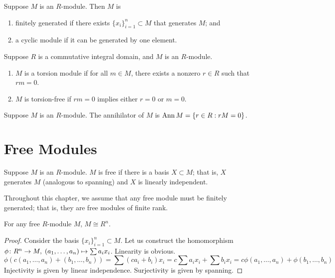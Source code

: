 \begin{definition}
    Suppose \(M\) is an \(R\)-module. Then \(M\) is 
    \begin{enumerate}[label={(\roman*)}, itemsep=0mm]
        \item finitely generated if there exists \({\{x_i\}}_{i=1}^n \subset M\) that generates \(M\); and
        \item a cyclic module if it can be generated by one element.
    \end{enumerate}
\end{definition}
\begin{definition}
    Suppose \(R\) is a commutative integral domain,
    and \(M\) is an \(R\)-module.
    \begin{enumerate}[label={(\roman*)}, itemsep=0mm]
        \item \(M\) is a torsion module if for all \(m \in M\),
            there exists a nonzero \(r \in R\) such that \(rm = 0\).
        \item \(M\) is torsion-free if \(rm = 0\) implies either \(r = 0\) or \(m = 0\).
    \end{enumerate}
\end{definition}
\begin{definition}
    Suppose \(M\) is an \(R\)-module.
    The annihilator of \(M\) is \(\operatorname{Ann} M = \{r \in R: rM = 0\}\).
\end{definition}


\section{Free Modules}

\begin{definition}
    Suppose \(M\) is an \(R\)-module.
    \(M\) is free if there is a basis \(X \subset M\);
    that is, \(X\) generates \(M\) (analogous to spanning)
    and \(X\) is linearly independent.
\end{definition}
\begin{remark}
    Throughout this chapter,
    we assume that any free module must be finitely generated;
    that is, they are free modules of finite rank.
\end{remark}
\begin{lemma}
    For any free \(R\)-module \(M\), \(M \cong R^n\).
\end{lemma}
\begin{proof}
    Consider the basis \({\{x_i\}}_{i=1}^n \subset M\).
    Let us construct the homomorphism \(\phi\colon R^n\to M,\;(a_1,\hdots,a_n)\mapsto\sum a_i x_i\).
    Linearity is obvious.
    \begin{equation*}
        \phi(c(a_1,\hdots,a_n)+(b_1,\hdots,b_n))
        = \sum (ca_i + b_i)x_i
        = c \sum a_i x_i + \sum b_i x_i
        = c\phi(a_1,\hdots,a_n) + \phi(b_1,\hdots,b_n)
    \end{equation*}
    Injectivity is given by linear independence.
    Surjectivity is given by spanning.
\end{proof}

